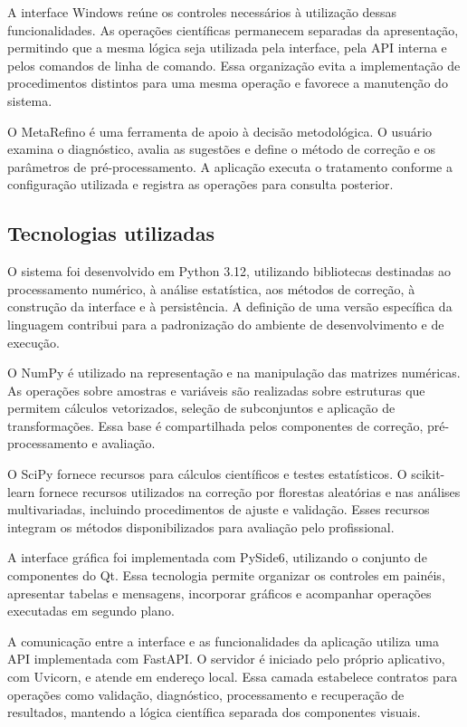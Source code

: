 A interface Windows reúne os controles necessários à utilização dessas funcionalidades. As operações científicas permanecem separadas da apresentação, permitindo que a mesma lógica seja utilizada pela interface, pela API interna e pelos comandos de linha de comando. Essa organização evita a implementação de procedimentos distintos para uma mesma operação e favorece a manutenção do sistema.

O MetaRefino é uma ferramenta de apoio à decisão metodológica. O usuário examina o diagnóstico, avalia as sugestões e define o método de correção e os parâmetros de pré-processamento. A aplicação executa o tratamento conforme a configuração utilizada e registra as operações para consulta posterior.

\subsection{Tecnologias utilizadas}
\label{subsec:tecnologias-utilizadas}

O sistema foi desenvolvido em Python 3.12, utilizando bibliotecas destinadas ao processamento numérico, à análise estatística, aos métodos de correção, à construção da interface e à persistência. A definição de uma versão específica da linguagem contribui para a padronização do ambiente de desenvolvimento e de execução.

O NumPy é utilizado na representação e na manipulação das matrizes numéricas. As operações sobre amostras e variáveis são realizadas sobre estruturas que permitem cálculos vetorizados, seleção de subconjuntos e aplicação de transformações. Essa base é compartilhada pelos componentes de correção, pré-processamento e avaliação.

O SciPy fornece recursos para cálculos científicos e testes estatísticos. O scikit-learn fornece recursos utilizados na correção por florestas aleatórias e nas análises multivariadas, incluindo procedimentos de ajuste e validação. Esses recursos integram os métodos disponibilizados para avaliação pelo profissional.

A interface gráfica foi implementada com PySide6, utilizando o conjunto de componentes do Qt. Essa tecnologia permite organizar os controles em painéis, apresentar tabelas e mensagens, incorporar gráficos e acompanhar operações executadas em segundo plano.

A comunicação entre a interface e as funcionalidades da aplicação utiliza uma API implementada com FastAPI. O servidor é iniciado pelo próprio aplicativo, com Uvicorn, e atende em endereço local. Essa camada estabelece contratos para operações como validação, diagnóstico, processamento e recuperação de resultados, mantendo a lógica científica separada dos componentes visuais.


